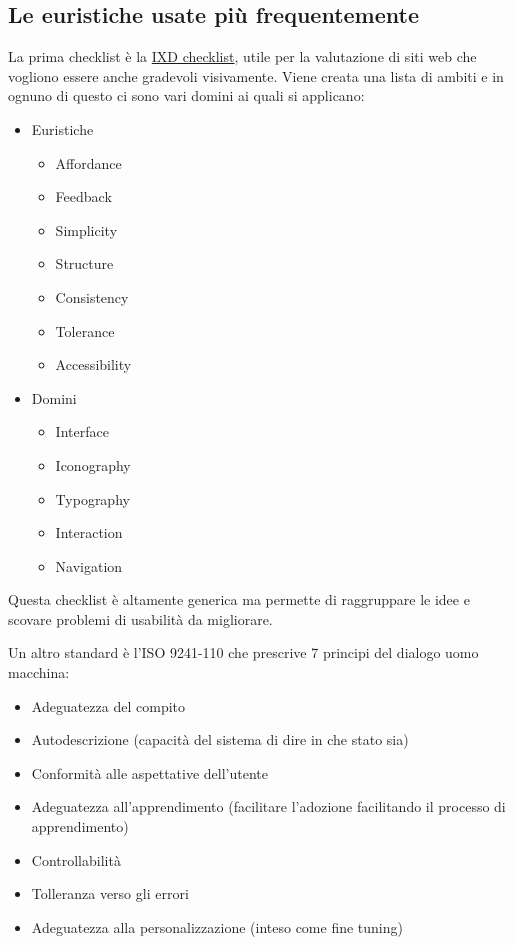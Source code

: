 \documentclass[11pt,a4paper]{book}
\begin{document}
\subsection{Le euristiche usate più frequentemente}
La prima checklist è la \href{https://ixdchecklist.com/}{IXD checklist}, utile per la valutazione di siti web che vogliono essere anche gradevoli visivamente. Viene creata una lista di ambiti e in ognuno di questo ci sono vari domini ai quali si applicano:
\begin{itemize}
	\item Euristiche
	\begin{itemize}
		\item Affordance
		\item Feedback
		\item Simplicity
		\item Structure
		\item Consistency
		\item Tolerance
		\item Accessibility 
	\end{itemize}
	\item Domini
	\begin{itemize}
		\item Interface
		\item Iconography
		\item Typography
		\item Interaction
		\item Navigation
	\end{itemize}
\end{itemize}

Questa checklist è altamente generica ma permette di raggruppare le idee e scovare problemi di usabilità da migliorare.

Un altro standard è l'ISO 9241-110 che prescrive 7 principi del dialogo uomo macchina:
\begin{itemize}
	\item Adeguatezza del compito
	\item Autodescrizione (capacità del sistema di dire in che stato sia)
	\item Conformità alle aspettative dell'utente
	\item Adeguatezza all'apprendimento (facilitare l'adozione facilitando il processo di apprendimento)
	\item Controllabilità
	\item Tolleranza verso gli errori
	\item Adeguatezza alla personalizzazione (inteso come fine tuning)
\end{itemize}
\end{document}
